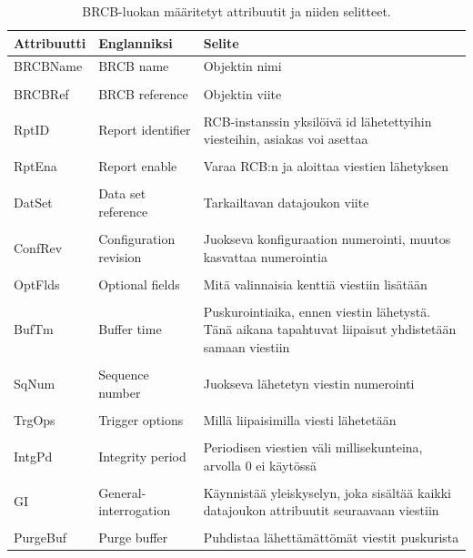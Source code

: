 \begin{table}[ht!]
	\caption{BRCB-luokan määritetyt attribuutit ja niiden selitteet.}
	\label{tab:iec61850-brcb-class-definition}
	\begin{tabular}{l | l | l}
		\hline
		\textbf{Attribuutti} & \textbf{Englanniksi} & \textbf{Selite} \\
		\hline \hline
		BRCBName & BRCB name & Objektin nimi \\
		&\\
		BRCBRef & BRCB reference & Objektin viite \\
		&\\
		RptID & Report identifier & \parbox[t]{7.5cm}{RCB-instanssin yksilöivä id lähetettyihin viesteihin, asiakas voi asettaa} \\
		&\\
		RptEna & Report enable & Varaa RCB:n ja aloittaa viestien lähetyksen \\
		&\\
		DatSet & Data set reference & Tarkailtavan datajoukon viite \\
		&\\
		ConfRev & Configuration revision & \parbox[t]{7.5cm}{Juokseva konfiguraation numerointi, muutos kasvattaa numerointia} \\
		&\\
		OptFlds & Optional fields & Mitä valinnaisia kenttiä viestiin lisätään \\
		&\\
		BufTm & Buffer time & \parbox[t]{7.5cm}{Puskurointiaika, ennen viestin lähetystä. Tänä aikana tapahtuvat liipaisut yhdistetään samaan viestiin} \\
		&\\
		SqNum & Sequence number & Juokseva lähetetyn viestin numerointi \\
		&\\
		TrgOps & Trigger options & Millä liipaisimilla viesti lähetetään \\
		&\\
		IntgPd & Integrity period & \parbox[t]{7.5cm}{Periodisen viestien väli millisekunteina, arvolla 0 ei käytössä} \\
		&\\
		GI & General-interrogation & \parbox[t]{7.5cm}{Käynnistää yleiskyselyn, joka sisältää kaikki datajoukon attribuutit seuraavaan viestiin} \\
		&\\
		PurgeBuf & Purge buffer & Puhdistaa lähettämättömät viestit puskurista \\

\end{tabular}
\end{table}
